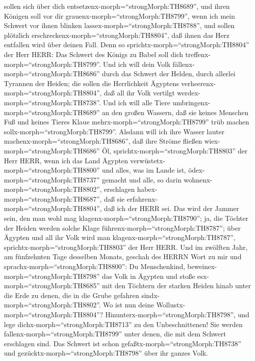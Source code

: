 sollen sich über dich entsetzenx-morph=``strongMorph:TH8689'', und ihren
Königen soll vor dir grauenx-morph=``strongMorph:TH8799'', wenn ich mein
Schwert vor ihnen blinken lassex-morph=``strongMorph:TH8788'', und
sollen plötzlich erschreckenx-morph=``strongMorph:TH8804'', daß ihnen
das Herz entfallen wird über deinen Fall.  Denn so
sprichtx-morph=``strongMorph:TH8804'' der Herr HERR: Das Schwert des
Königs zu Babel soll dich treffenx-morph=``strongMorph:TH8799''.
 Und ich will dein Volk
fällenx-morph=``strongMorph:TH8686'' durch das Schwert der Helden, durch
allerlei Tyrannen der Heiden; die sollen die Herrlichkeit Ägyptens
verheerenx-morph=``strongMorph:TH8804'', daß all ihr Volk vertilgt
werdex-morph=``strongMorph:TH8738''.  Und ich will alle
Tiere umbringenx-morph=``strongMorph:TH8689'' an den großen Wassern, daß
sie keines Menschen Fuß und keines Tieres Klaue
mehrx-morph=``strongMorph:TH8799'' trüb machen
sollx-morph=``strongMorph:TH8799''.  Alsdann will ich ihre
Wasser lauter machenx-morph=``strongMorph:TH8686'', daß ihre Ströme
fließen wiex-morph=``strongMorph:TH8686'' Öl,
sprichtx-morph=``strongMorph:TH8803'' der Herr HERR,  wenn
ich das Land Ägypten verwüstetx-morph=``strongMorph:TH8800'' und alles,
was im Lande ist, ödex-morph=``strongMorph:TH8737'' gemacht und alle, so
darin wohnenx-morph=``strongMorph:TH8802'', erschlagen
habex-morph=``strongMorph:TH8687'', daß sie
erfahrenx-morph=``strongMorph:TH8804'', daß ich der HERR sei.
 Das wird der Jammer sein, den man wohl mag
klagenx-morph=``strongMorph:TH8790''; ja, die Töchter der Heiden werden
solche Klage führenx-morph=``strongMorph:TH8787''; über Ägypten und all
ihr Volk wird man klagenx-morph=``strongMorph:TH8787'',
sprichtx-morph=``strongMorph:TH8803'' der Herr HERR.  Und
im zwölften Jahr, am fünfzehnten Tage desselben Monats, geschah des
HERRN Wort zu mir und sprachx-morph=``strongMorph:TH8800'':
 Du Menschenkind, beweinex-morph=``strongMorph:TH8798'' das
Volk in Ägypten und stoße esx-morph=``strongMorph:TH8685'' mit den
Töchtern der starken Heiden hinab unter die Erde zu denen, die in die
Grube gefahren sindx-morph=``strongMorph:TH8802''.  Wo ist
nun deine Wollustx-morph=``strongMorph:TH8804''?
Hinunterx-morph=``strongMorph:TH8798'', und lege
dichx-morph=``strongMorph:TH8713'' zu den Unbeschnittenen! 
Sie werden fallenx-morph=``strongMorph:TH8799'' unter denen, die mit dem
Schwert erschlagen sind. Das Schwert ist schon
gefaßtx-morph=``strongMorph:TH8738'' und
gezücktx-morph=``strongMorph:TH8798'' über ihr ganzes Volk.
